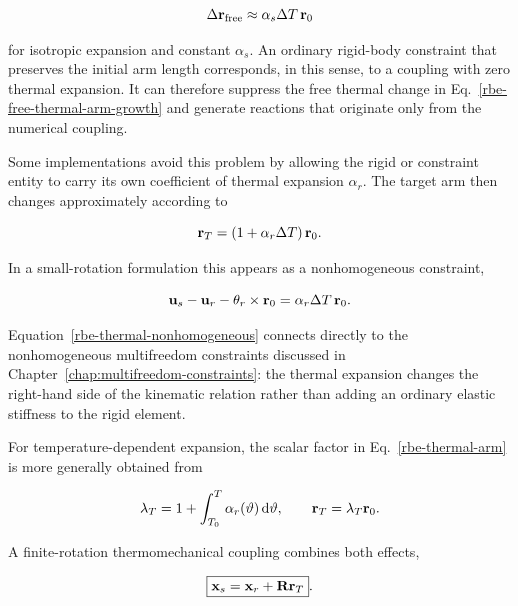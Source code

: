 \begin{equation}\label{rbe-free-thermal-arm-growth}
    \Delta\mathbf{r}_{\mathrm{free}}
    \approx \alpha_s\Delta T\,\mathbf{r}_0
\end{equation}

for isotropic expansion and constant $\alpha_s$. An ordinary rigid-body
constraint that preserves the initial arm length corresponds, in this sense, to
a coupling with zero thermal expansion. It can therefore suppress the free
thermal change in Eq.~\eqref{rbe-free-thermal-arm-growth} and generate reactions
that originate only from the numerical coupling.

Some implementations avoid this problem by allowing the rigid or constraint
entity to carry its own coefficient of thermal expansion $\alpha_r$. The target
arm then changes approximately according to

\begin{equation}\label{rbe-thermal-arm}
    \mathbf{r}_T
    =\left(1+\alpha_r\Delta T\right)\mathbf{r}_0.
\end{equation}

In a small-rotation formulation this appears as a nonhomogeneous constraint,

\begin{equation}\label{rbe-thermal-nonhomogeneous}
    \mathbf{u}_s-\mathbf{u}_r-\mathbf{\theta}_r\times\mathbf{r}_0
    =\alpha_r\Delta T\,\mathbf{r}_0.
\end{equation}

Equation~\eqref{rbe-thermal-nonhomogeneous} connects directly to the
nonhomogeneous multifreedom constraints discussed in Chapter~\ref{chap:multifreedom-constraints}:
the thermal expansion changes the right-hand side of the kinematic relation
rather than adding an ordinary elastic stiffness to the rigid element.

For temperature-dependent expansion, the scalar factor in
Eq.~\eqref{rbe-thermal-arm} is more generally obtained from

\begin{equation}
    \lambda_T
    =1+\int_{T_0}^{T}\alpha_r(\vartheta)\,\mathrm{d}\vartheta,
    \qquad
    \mathbf{r}_T=\lambda_T\mathbf{r}_0.
\end{equation}

A finite-rotation thermomechanical coupling combines both effects,

\begin{equation}\label{rbe-thermal-finite-rotation}
    \boxed{\mathbf{x}_s=\mathbf{x}_r+\mathbf{R}\mathbf{r}_T}.
\end{equation}

